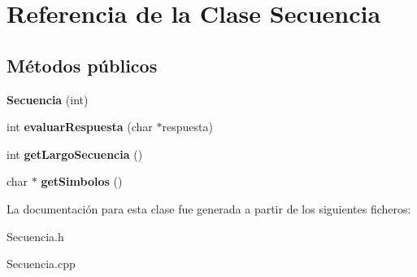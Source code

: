 \hypertarget{classSecuencia}{\section{Referencia de la Clase Secuencia}
\label{classSecuencia}
}
\subsection*{Métodos públicos}
\begin{DoxyCompactItemize}
\item 
\hypertarget{classSecuencia_a506048ef2ac72769f236cca5418c70dd}{{\bfseries Secuencia} (int)}\label{classSecuencia_a506048ef2ac72769f236cca5418c70dd}

\item 
\hypertarget{classSecuencia_a4d83bb7921ec8838348c4e887b28644c}{int {\bfseries evaluar\-Respuesta} (char $\ast$respuesta)}\label{classSecuencia_a4d83bb7921ec8838348c4e887b28644c}

\item 
\hypertarget{classSecuencia_a9d78db236dd037a2acd620669cf2557e}{int {\bfseries get\-Largo\-Secuencia} ()}\label{classSecuencia_a9d78db236dd037a2acd620669cf2557e}

\item 
\hypertarget{classSecuencia_a174efa01bcb29b7b3fa19a2dac1c767b}{char $\ast$ {\bfseries get\-Simbolos} ()}\label{classSecuencia_a174efa01bcb29b7b3fa19a2dac1c767b}

\end{DoxyCompactItemize}


La documentación para esta clase fue generada a partir de los siguientes ficheros\-:\begin{DoxyCompactItemize}
\item 
Secuencia.\-h\item 
Secuencia.\-cpp\end{DoxyCompactItemize}
